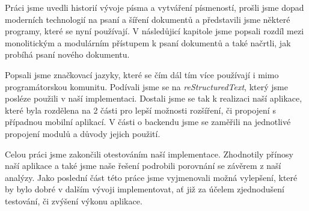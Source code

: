Práci jsme uvedli historií vývoje písma a vytváření písmeností, prošli jsme dopad moderních technologií na psaní a šíření dokumentů a  představili jsme
některé programy, které se nyní používají. V následůjicí kapitole jsme popsali rozdíl mezi monolitickým a modulárním přístupem k psaní dokumentů a také
načrtli, jak probíhá psaní nového dokumentu.

Popsali jsme značkovací jazyky, které se čím dál tím více používají i mimo programátorskou komunitu. Podívali jsme se na
\textit{reStructuredText}, který jsme posléze použili v naší implementaci. Dostali jsme se tak k realizaci naší aplikace, které byla rozdělena na 2 části
pro lepší možnosti rozšíření, či propojení s případnou mobilní aplikací. V části o backendu jsme se zaměřili na jednotlivé propojení modulů a důvody jejich
použití.

Celou práci jsme zakončili otestováním naší implementace. Zhodnotily přínosy naší aplikace a také jsme naše řešení podrobili porovnání se závěrem z naší analýzy.
Jako poslední
část této práce jsme vyjmenovali možná vylepšení, které by bylo dobré v dalším vývoji implementovat, ať již za účelem zjednodušení testování, či zvýšení výkonu aplikace.